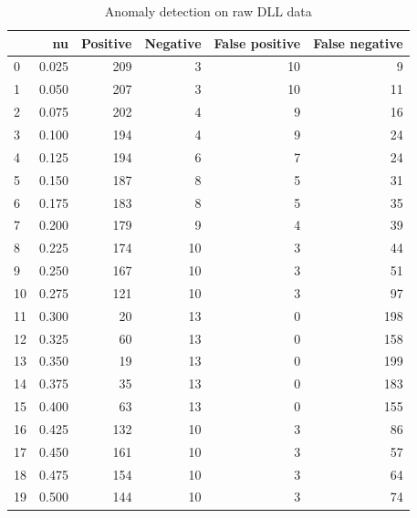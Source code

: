 \documentclass[a4paper,twoside,12pt]{book}
\begin{document}
\begin{appendices}
\begin{table}
	\centering
	\caption{Anomaly detection on raw DLL data}
	\label{id:tab:rawDlls}
	\begin{tabular}{lrrrrr}
		\toprule
		{} &     nu &  Positive &  Negative &  False positive &  False negative \\
		\midrule
		0  &  0.025 &       209 &         3 &              10 &               9 \\
		1  &  0.050 &       207 &         3 &              10 &              11 \\
		2  &  0.075 &       202 &         4 &               9 &              16 \\
		3  &  0.100 &       194 &         4 &               9 &              24 \\
		4  &  0.125 &       194 &         6 &               7 &              24 \\
		5  &  0.150 &       187 &         8 &               5 &              31 \\
		6  &  0.175 &       183 &         8 &               5 &              35 \\
		7  &  0.200 &       179 &         9 &               4 &              39 \\
		8  &  0.225 &       174 &        10 &               3 &              44 \\
		9  &  0.250 &       167 &        10 &               3 &              51 \\
		10 &  0.275 &       121 &        10 &               3 &              97 \\
		11 &  0.300 &        20 &        13 &               0 &             198 \\
		12 &  0.325 &        60 &        13 &               0 &             158 \\
		13 &  0.350 &        19 &        13 &               0 &             199 \\
		14 &  0.375 &        35 &        13 &               0 &             183 \\
		15 &  0.400 &        63 &        13 &               0 &             155 \\
		16 &  0.425 &       132 &        10 &               3 &              86 \\
		17 &  0.450 &       161 &        10 &               3 &              57 \\
		18 &  0.475 &       154 &        10 &               3 &              64 \\
		19 &  0.500 &       144 &        10 &               3 &              74 \\

\end{tabular}
\end{table}
\end{appendices}
\end{document}
